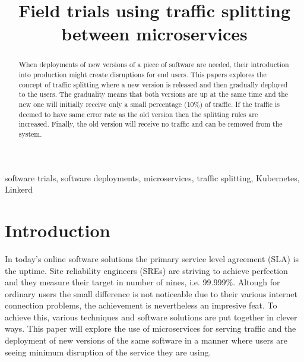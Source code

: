 \documentclass[conference]{IEEEtran}
\begin{document}
\title{Field trials using traffic splitting between microservices}

\author{
    \and
}

\maketitle

\begin{abstract}
    When deployments of new versions of a piece of software are needed, their introduction into production might create disruptions for end users. This papers explores the concept of traffic splitting where a new version is released and then gradually deployed to the users. The graduality means that both versions are up at the same time and the new one will initially receive only a small percentage (10\%) of traffic. If the traffic is deemed to have same error rate as the old version then the splitting rules are increased. Finally, the old version will receive no traffic and can be removed from the system.
\end{abstract}

\begin{IEEEkeywords}
    software trials, software deployments, microservices, traffic splitting, Kubernetes, Linkerd
\end{IEEEkeywords}

\section{Introduction}
    In today's online software solutions the primary service level agreement (SLA) is the uptime. Site reliability engineers (SREs) are striving to achieve perfection and they measure their target in number of nines, i.e. 99.999\%. Altough for ordinary users the small difference is not noticeable due to their various internet connection problems, the achievement is nevertheless an impresive feat. To achieve this, various techniques and software solutions are put together in clever ways. This paper will explore the use of microservices for serving traffic and the deployment of new versions of the same software in a manner where users are seeing minimum disruption of the service they are using.
\end{document}
